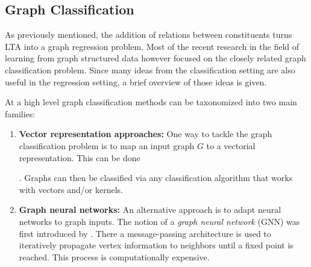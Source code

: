 \documentclass[12pt]{scrartcl}
\begin{document}
\subsection{Graph Classification}%
\label{sec:related-work:gc}

As previously mentioned, the addition of relations between constituents turns LTA into a graph regression problem.
Most of the recent research in the field of learning from graph structured data however focused on the closely related graph classification problem.
Since many ideas from the classification setting are also useful in the regression setting, a brief overview of those ideas is given.

At a high level graph classification methods can be taxonomized into two main families:
\begin{enumerate}[label=\textbf{\arabic*.}]
	\item \textbf{Vector representation approaches:}
		One way to tackle the graph classification problem is to map an input graph $G$ to a vectorial representation.
		This can be done
		.
		Graphs can then be classified via any classification algorithm that works with vectors and/or kernels.
	\item \textbf{Graph neural networks:}
		An alternative approach is to adapt neural networks to graph inputs.
		The notion of a \textit{graph neural network} (GNN) was first introduced by \citet{Gori2005}.\@
		There a message-passing architecture is used to iteratively propagate vertex information to neighbors until a fixed point is reached.
		This process is computationally expensive.


\end{enumerate}
\end{document}
